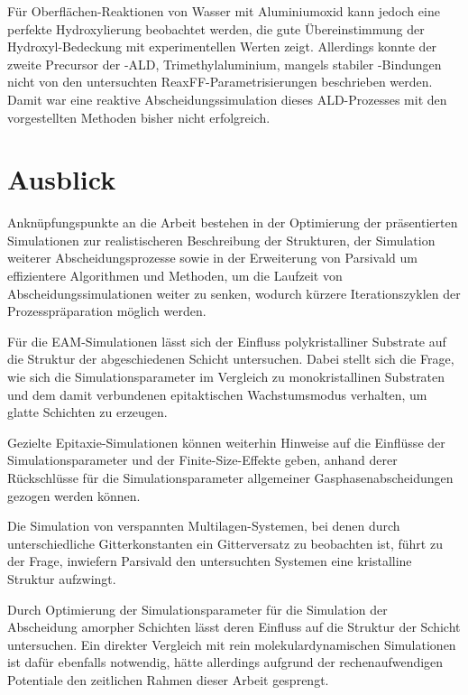 Für Oberflächen-Reaktionen von Wasser mit Aluminiumoxid kann jedoch eine perfekte Hydroxylierung beobachtet werden, die gute Übereinstimmung der Hydroxyl-Bedeckung mit experimentellen Werten zeigt.
Allerdings konnte der zweite Precursor der -ALD, Trimethylaluminium, mangels stabiler -Bindungen nicht von den untersuchten ReaxFF-Parametrisierungen beschrieben werden.
Damit war eine reaktive Abscheidungssimulation dieses ALD-Prozesses mit den vorgestellten Methoden bisher nicht erfolgreich.

\section{Ausblick}
Anknüpfungspunkte an die Arbeit bestehen in der Optimierung der präsentierten Simulationen zur realistischeren Beschreibung der Strukturen, der Simulation weiterer Abscheidungsprozesse sowie in der Erweiterung von Parsivald um effizientere Algorithmen und Methoden, um die Laufzeit von Abscheidungssimulationen weiter zu senken, wodurch kürzere Iterationszyklen der Prozesspräparation möglich werden.

Für die EAM-Simulationen lässt sich der Einfluss polykristalliner Substrate auf die Struktur der abgeschiedenen Schicht untersuchen.
Dabei stellt sich die Frage, wie sich die Simulationsparameter im Vergleich zu monokristallinen Substraten und dem damit verbundenen epitaktischen Wachstumsmodus verhalten, um glatte Schichten zu erzeugen.

Gezielte Epitaxie-Simulationen können weiterhin Hinweise auf die Einflüsse der Simulationsparameter und der Finite-Size-Effekte geben, anhand derer Rückschlüsse für die Simulationsparameter allgemeiner Gasphasenabscheidungen gezogen werden können.

Die Simulation von verspannten Multilagen-Systemen, bei denen durch unterschiedliche Gitterkonstanten ein Gitterversatz zu beobachten ist, führt zu der Frage, inwiefern Parsivald den untersuchten Systemen eine kristalline Struktur aufzwingt.

Durch Optimierung der Simulationsparameter für die Simulation der Abscheidung amorpher Schichten lässt deren Einfluss auf die Struktur der Schicht untersuchen.
Ein direkter Vergleich mit rein molekulardynamischen Simulationen ist dafür ebenfalls notwendig, hätte allerdings aufgrund der rechenaufwendigen Potentiale den zeitlichen Rahmen dieser Arbeit gesprengt.

